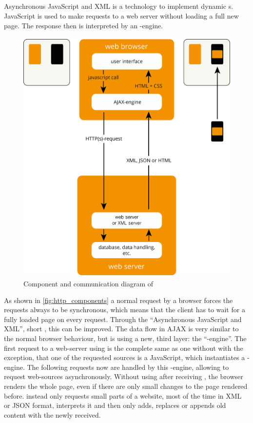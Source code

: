 \subsection{\ajax{}\label{ajax}}
Asynchronous JavaScript and XML is a technology to implement dynamic \webPage{}s.
JavaScript is used to make requests to a web server without loading a full new page.
The response then is interpreted by an \ajax{}-engine.
\begin{figure}[H]
\centering
\includegraphics[height=13cm]{images/ajax.png}
\caption[ajax_components]{Component and communication diagram of \ajax{}}
\label{fig:ajax_components}
\end{figure}    
As shown in \ref{fig:http_components} a normal \http{} request by a browser forces the requests always to be synchronous, which means that the client has to wait for a fully loaded page on every request.
Through the \enquote{Asynchronous JavaScript and XML}, short \ajax{}, this can be improved.
The data flow in AJAX is very similar to the normal browser behaviour, but is using a new, third layer: the \enquote{\ajax{}-engine}.
The first request to a web-server using \ajax{} is the complete same as one without \ajax{} with the exception, that one of the requested sources is a JavaScript, which instantiates a \ajax{}-engine.
The following requests now are handled by this \ajax{}-engine, allowing to request web-sources asynchronously.
Without using \ajax{} after receiving \html{}, the browser renders the whole page, even if there are only small changes to the page rendered before.
\ajax{} instead only requests small parts of a website, most of the time in XML or JSON format, interprets it and then only adds, replaces or appends old content with the newly received.


